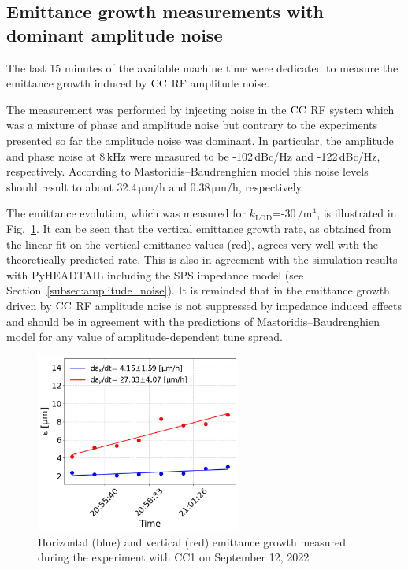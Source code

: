 \subsection{Emittance growth measurements with dominant amplitude noise}
The last 15 minutes of the available machine time were dedicated to measure the emittance growth induced by ${\mathrm{CC}}$ RF amplitude noise. 

The measurement was performed by injecting noise in the ${\mathrm{CC}}$ RF system which was a mixture of phase and amplitude noise but contrary to the experiments presented so far the amplitude noise was dominant. In particular, the amplitude and phase noise at 8\,kHz were measured to be -102\,dBc/Hz and -122\,dBc/Hz, respectively. According to Mastoridis--Baudrenghien model this noise levels should result to about 32.4\,$\mathrm{\mu m/h}$ and 0.38\,$\mathrm{\mu m/h}$, respectively. %


The emittance evolution, which was measured for $k_\mathrm{LOD}$=-30\,$\mathrm{/m^4}$, is illustrated in Fig.~\ref{fig:H_V_emit_growth_Amplitude_noise_coast12}. It can be seen that the vertical emittance growth rate, as obtained from the linear fit on the vertical emittance values (red), agrees very well with the theoretically predicted rate. This is also in agreement with the simulation results with PyHEADTAIL including the SPS impedance model (see Section~\ref{subsec:amplitude_noise}). It is reminded that in the emittance growth driven by ${\mathrm{CC}}$ RF amplitude noise is not suppressed by impedance induced effects and should be in agreement with the predictions of Mastoridis--Baudrenghien model for any value of amplitude-dependent tune spread.


\begin{figure}[!h]
   \centering         
   \includegraphics[width=0.6\textwidth]{images/Ch8/cc_md_sep22_AN_coast12.png}
       \caption{Horizontal (blue) and vertical (red) emittance growth measured during the experiment with CC1 on September 12, 2022}
       \label{fig:H_V_emit_growth_Amplitude_noise_coast12}
\end{figure}



